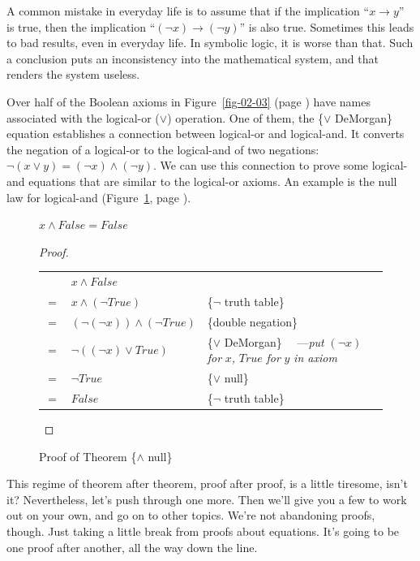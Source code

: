 A common mistake in everyday life is to assume that if the
implication ``$x \rightarrow y$'' is true, then the implication
``$(\neg x) \rightarrow (\neg y)$''
is also true. Sometimes this leads to bad
results, even in everyday life. In symbolic logic,
it is worse than that. Such a conclusion puts an
inconsistency into the mathematical system, and that renders the system useless.

Over half of the Boolean axioms in Figure~\ref{fig-02-03} (page \pageref{fig-02-03})
have names associated with the logical-or ($\vee$) operation.
One of them, the
\{$\vee$ DeMorgan\} equation
establishes a connection between logical-or and logical-and.
It converts the negation of a logical-or to the logical-and of two negations:
$\neg(x \vee y) = (\neg x) \wedge (\neg y)$.
We can use this connection to prove some logical-and equations
that are similar to the logical-or axioms.
An example is the null law for logical-and
(Figure~\ref{fig:and-null-thm}, page \pageref{fig:and-null-thm}).

\begin{figure}
\begin{theorem}
$x \wedge False = False$
\end{theorem}

\begin{proof}
\mbox{} \\
\begin{tabular}{llp{3.15in}}
    & $x \wedge False$                       & \\
$=$ & $x \wedge (\neg True)$                 & \{$\neg$ truth table\} \\
$=$ & $(\neg (\neg x)) \wedge (\neg True)$   & \{double negation\} \\
$=$ & $\neg ((\neg x) \vee True)$            & \{$\vee$ DeMorgan\} ~~---\emph{put} $(\neg x)$ \emph{for} $x$\emph{,} $True$ \emph{for} $y$ \emph{in axiom}\\
$=$ & $\neg True$                            & \{$\vee$ null\} \\
$=$ & $False$                                & \{$\neg$ truth table\} \\
\end{tabular}

\end{proof}
\caption{Proof of Theorem \{$\wedge$ null\}}
\label{fig:and-null-thm}
\end{figure}

This regime of theorem after theorem, proof after proof, is a little tiresome, isn't it?
Nevertheless, let's push through one more.
Then we'll give you a few to work out on your own, and go on to other topics.
We're not abandoning proofs, though.
Just taking a little break from proofs about equations.
It's going to be one proof after another, all the way down the line.

